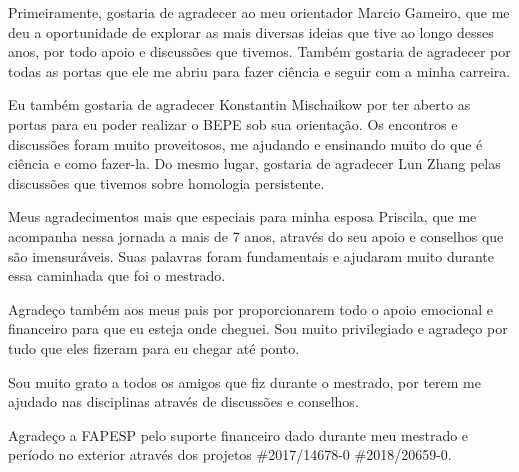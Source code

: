 
Primeiramente, gostaria de agradecer ao meu orientador Marcio Gameiro,
que me deu a oportunidade de explorar as mais diversas ideias que tive
ao longo desses anos, por todo apoio e discussões que tivemos. 
Também gostaria de agradecer por todas 
as portas que ele me abriu para fazer ciência e seguir com a minha carreira. 

Eu também gostaria de agradecer Konstantin Mischaikow por ter aberto
as portas para eu poder realizar o BEPE sob sua orientação. Os encontros
e discussões foram muito proveitosos, me ajudando e ensinando 
muito do que é ciência e como fazer-la. Do mesmo lugar, gostaria
de agradecer Lun Zhang pelas discussões que tivemos sobre homologia persistente. 

Meus agradecimentos mais que especiais para minha esposa Priscila,
que me acompanha nessa jornada a mais de 7 anos, através do seu apoio
e conselhos que são imensuráveis. Suas palavras foram 
fundamentais e ajudaram muito durante essa caminhada que foi o mestrado. 

Agradeço também aos meus pais por proporcionarem todo o apoio emocional
e financeiro para que eu esteja onde cheguei. Sou muito privilegiado
e agradeço por tudo que eles fizeram para eu chegar até ponto. 

Sou muito grato a todos os amigos que fiz durante o mestrado, por terem 
me ajudado nas disciplinas através de discussões e conselhos.

Agradeço a FAPESP pelo suporte financeiro dado durante meu mestrado
e período no exterior através dos projetos \#2017/14678-0 \#2018/20659-0. 


